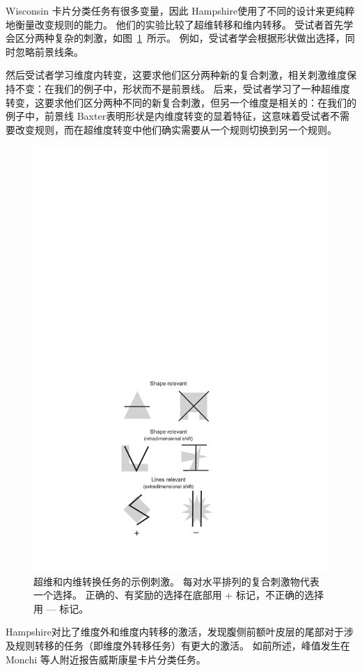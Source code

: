 Wisconsin 卡片分类任务有很多变量，因此 Hampshire\cite{hampshire2006fractionating}使用了不同的设计来更纯粹地衡量改变规则的能力。 
他们的实验比较了超维转移和维内转移。 
受试者首先学会区分两种复杂的刺激，如图~\ref{fig:7_10}~所示。
例如，受试者学会根据形状做出选择，同时忽略前景线条。
\par


然后受试者学习维度内转变，这要求他们区分两种新的复合刺激，相关刺激维度保持不变：在我们的例子中，形状而不是前景线。 
后来，受试者学习了一种超维度转变，这要求他们区分两种不同的新复合刺激，但另一个维度是相关的：在我们的例子中，前景线 Baxter\cite{baxter2007orbital}表明形状是内维度转变的显着特征，这意味着受试者不需要改变规则，而在超维度转变中他们确实需要从一个规则切换到另一个规则。


  \begin{figure}
  	\centering
  	\includegraphics[width=0.6\linewidth]{chap7/7_10}
  	\caption{超维和内维转换任务的示例刺激。 
  		每对水平排列的复合刺激物代表一个选择。 
  		正确的、有奖励的选择在底部用 + 标记，不正确的选择用 — 标记\cite{dias1996primate}。\label{fig:7_10}}
  \end{figure}
\par


Hampshire\cite{hampshire2006fractionating}对比了维度外和维度内转移的激活，发现腹侧前额叶皮层的尾部对于涉及规则转移的任务（即维度外转移任务）有更大的激活。 
如前所述，峰值发生在 Monchi 等人附近\cite{monchi2001wisconsin}报告威斯康星卡片分类任务。
\par


